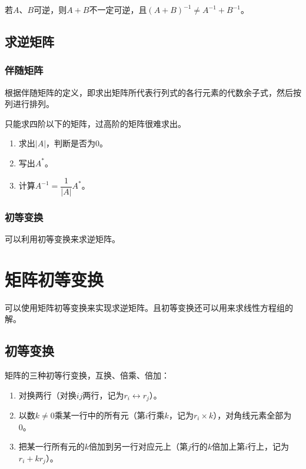 \documentclass[UTF8, 12pt]{ctexart}
\begin{document}
若$A$、$B$可逆，则$A+B$不一定可逆，且$(A+B)^{-1}\neq A^{-1}+B^{-1}$。

\subsection{求逆矩阵}

\subsubsection{伴随矩阵}

根据伴随矩阵的定义，即求出矩阵所代表行列式的各行元素的代数余子式，然后按列进行排列。

只能求四阶以下的矩阵，过高阶的矩阵很难求出。

\begin{enumerate}
\item 求出$\vert A\vert$，判断是否为0。
\item 写出$A^*$。
\item 计算$A^{-1}=\dfrac{1}{\vert A\vert}A^*$。
\end{enumerate}

\subsubsection{初等变换}

可以利用初等变换来求逆矩阵。

\section{矩阵初等变换}

可以使用矩阵初等变换来实现求逆矩阵。且初等变换还可以用来求线性方程组的解。

\subsection{初等变换}

矩阵的三种初等行变换，互换、倍乘、倍加：

\begin{enumerate}
\item 对换两行（对换$ij$两行，记为$r_i\leftrightarrow r_j$）。
\item 以数$k\neq0$乘某一行中的所有元（第$i$行乘$k$，记为$r_i\times k$），对角线元素全部为0。
\item 把某一行所有元的$k$倍加到另一行对应元上（第$j$行的$k$倍加上第$i$行上，记为$r_i+kr_j$）。
\end{enumerate}
\end{document}
